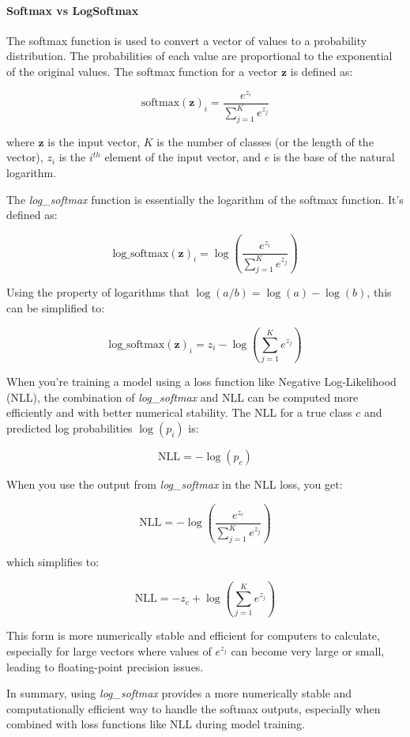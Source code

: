 \paragraph{Softmax vs LogSoftmax}

The softmax function is used to convert a vector of values to a probability distribution.
The probabilities of each value are proportional to the exponential of the original values. The softmax function for a vector \( \mathbf{z} \) is defined as:

\[ \mathrm{softmax}(\mathbf{z})_i = \frac{e^{z_i}}{\sum_{j=1}^{K} e^{z_j}} \]

where \( \mathbf{z} \) is the input vector, \( K \) is the number of classes (or the length of the vector), \( z_i \) is the \( i^{th} \) element of the input vector, and \( e \) is the base of the natural logarithm.

The \emph{log\_softmax} function is essentially the logarithm of the softmax function.
It's defined as:

\[ \mathrm{log\_softmax}(\mathbf{z})_i = \log\left(\frac{e^{z_i}}{\sum_{j=1}^{K} e^{z_j}}\right) \]

Using the property of logarithms that \( \log(a/b) = \log(a) - \log(b) \), this can be simplified to:

\[ \mathrm{log\_softmax}(\mathbf{z})_i = z_i - \log\left(\sum_{j=1}^{K} e^{z_j}\right) \]

When you're training a model using a loss function like Negative Log-Likelihood (NLL), the combination of \emph{log\_softmax} and NLL can be computed more efficiently and with better numerical stability.
The NLL for a true class \( c \) and predicted log probabilities \( \log(p_i) \) is:

\[ \mathrm{NLL} = -\log(p_c) \]

When you use the output from \emph{log\_softmax} in the NLL loss, you get:

\[ \mathrm{NLL} = -\log\left(\frac{e^{z_c}}{\sum_{j=1}^{K} e^{z_j}}\right) \]

which simplifies to:

\[ \mathrm{NLL} = -z_c + \log\left(\sum_{j=1}^{K} e^{z_j}\right) \]

This form is more numerically stable and efficient for computers to calculate, especially for large vectors where values of \( e^{z_j} \) can become very large or small, leading to floating-point precision issues.

In summary, using \emph{log\_softmax} provides a more numerically stable and computationally efficient way to handle the softmax outputs, especially when combined with loss functions like NLL during model training.


